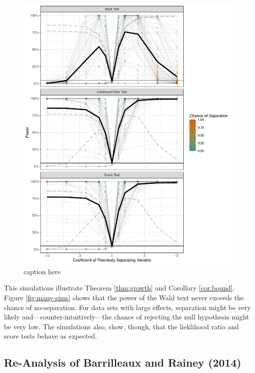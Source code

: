 \documentclass[
]{article}
\begin{document}
\begin{figure}[h]
\includegraphics[width=\textwidth]{doc/fig/power-funs.pdf}
\caption{caption here}\label{fig:power-funs}
\end{figure}

This simulations illustrate Theorem \ref{thm:growth} and Corollary
\ref{cor:bound}. Figure \ref{fig:many-sims} shows that the power of the
Wald text never exceeds the chance of no-separation. For data sets with
large effects, separation might be very likely
and---counter-intuitively---the chance of rejecting the null hypothesis
might be very low. The simulations also, show, though, that the
lieklihood ratio and score tests behave as expected.

\hypertarget{re-analysis-of-barrilleaux-and-rainey-2014}{%
\subsection{Re-Analysis of Barrilleaux and Rainey
(2014)}\label{re-analysis-of-barrilleaux-and-rainey-2014}}
\end{document}

